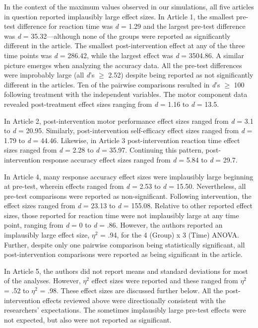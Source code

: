\documentclass[
  english,
  man,floatsintext]{apa7}
\begin{document}
In the context of the maximum values observed in our simulations, all five articles in question reported implausibly large effect sizes. In Article 1, the smallest pre-test difference for reaction time was \emph{d} = 1.29 and the largest pre-test difference was \emph{d} = 35.32---although none of the groups were reported as significantly different in the article. The smallest post-intervention effect at any of the three time points was \emph{d} = 286.42, while the largest effect was \emph{d} = 3504.86. A similar picture emerges when analyzing the accuracy data. All the pre-test differences were improbably large (all \emph{d}'s \(\geq\) 2.52) despite being reported as not significantly different in the articles. Ten of the pairwise comparisons resulted in \emph{d}'s \(\geq\) 100 following treatment with the independent variables. The motor component data revealed post-treatment effect sizes ranging from \emph{d} = 1.16 to \emph{d} = 13.5.

In Article 2, post-intervention motor performance effect sizes ranged from \emph{d} = 3.1 to \emph{d} = 20.95. Similarly, post-intervention self-efficacy effect sizes ranged from \emph{d} = 1.79 to \emph{d} = 44.46. Likewise, in Article 3 post-intervention reaction time effect sizes ranged from \emph{d} = 2.28 to \emph{d} = 35.97. Continuing this pattern, post-intervention response accuracy effect sizes ranged from \emph{d} = 5.84 to \emph{d} = 29.7.

In Article 4, many response accuracy effect sizes were implausibly large beginning at pre-test, wherein effects ranged from \emph{d} = 2.53 to \emph{d} = 15.50. Nevertheless, all pre-test comparisons were reported as non-significant. Following intervention, the effect sizes ranged from \emph{d} = 23.13 to \emph{d} = 155.08. Relative to other reported effect sizes, those reported for reaction time were not implausibly large at any time point, ranging from \emph{d} = 0 to \emph{d} = .86. However, the authors reported an implausibly large effect size, \(\eta^{2}\) = .94, for the 4 (Group) x 3 (Time) ANOVA. Further, despite only one pairwise comparison being statistically significant, all post-intervention comparisons were reported as being significant in the article.

In Article 5, the authors did not report means and standard deviations for most of the analyses. However, \(\eta^{2}\) effect sizes were reported and these ranged from \(\eta^{2}\) = .52 to \(\eta^{2}\) = .98. These effect sizes are discussed further below. All the post-intervention effects reviewed above were directionally consistent with the researchers' expectations. The sometimes implausibly large pre-test effects were not expected, but also were not reported as significant.
\end{document}
